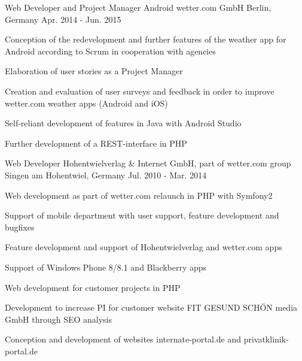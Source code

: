 \begin{cventries}
  \cventry
    {Web Developer and Project Manager Android} %
    {wetter.com GmbH} %
    {Berlin, Germany} %
    {Apr. 2014 - Jun. 2015} %
    {
      \begin{cvitems} %
        \item {Conception of the redevelopment and further features of the weather app for Android according to Scrum in cooperation with agencies}
        \item {Elaboration of user stories as a Project Manager}
        \item {Creation and evaluation of user surveys and feedback in order to improve wetter.com weather apps (Android and iOS)}
        \item {Self-reliant development of features in Java with Android Studio}
        \item {Further development of a REST-interface in PHP}
      \end{cvitems}
    }

  \cventry
    {Web Developer} %
    {Hohentwielverlag \& Internet GmbH, part of wetter.com group} %
    {Singen am Hohentwiel, Germany} %
    {Jul. 2010 - Mar. 2014} %
    {
      \begin{cvitems} %
        \item {Web development as part of wetter.com relaunch in PHP with Symfony2}
        \item {Support of mobile department with user support, feature development and bugfixes}
        \item {Feature development and support of Hohentwielverlag and wetter.com apps}
        \item {Support of Windows Phone 8/8.1 and Blackberry apps}
        \item {Web development for customer projects in PHP}
        \item {Development to increase PI for customer website FIT GESUND SCHÖN media GmbH through SEO analysis}
        \item {Conception and development of websites internate-portal.de and privatklinik-portal.de}
      \end{cvitems}
    }
    

\end{cventries}

